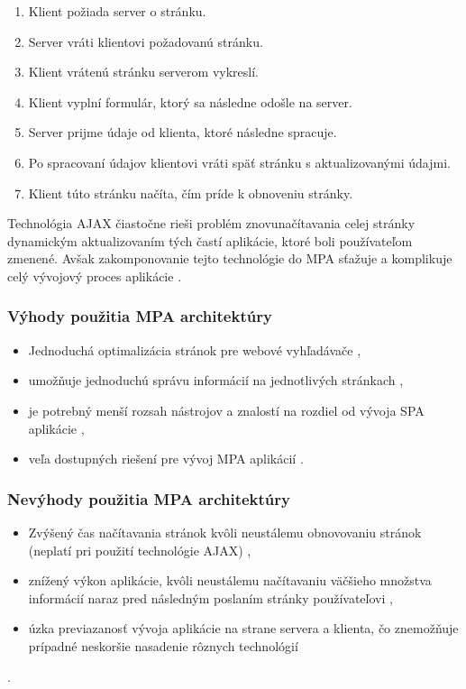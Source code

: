 \begin{enumerate}
	\item Klient požiada server o stránku.
	\item Server vráti klientovi požadovanú stránku.
	\item Klient vrátenú stránku serverom vykreslí.
	\item Klient vyplní formulár, ktorý sa následne odošle na server.
	\item Server prijme údaje od klienta, ktoré následne spracuje.
	\item Po spracovaní údajov klientovi vráti späť stránku s aktualizovanými údajmi.
	\item Klient túto stránku načíta, čím príde k obnoveniu stránky.
\end{enumerate}

Technológia AJAX čiastočne rieši problém znovunačítavania celej stránky dynamickým aktualizovaním tých častí aplikácie, ktoré boli používateľom zmenené. Avšak zakomponovanie tejto technológie do MPA sťažuje a komplikuje celý vývojový proces aplikácie \cite{mpa-architektura}.

\subsubsection*{Výhody použitia MPA architektúry}

\begin{itemize}
	\item Jednoduchá optimalizácia stránok pre webové vyhľadávače \cite{spa-vs-mpa-1},
	\item umožňuje jednoduchú správu informácií na jednotlivých stránkach \cite{spa-vs-mpa-3},
	\item je potrebný menší rozsah nástrojov a znalostí na rozdiel od vývoja SPA aplikácie \cite{spa-vs-mpa-2},
	\item veľa dostupných riešení pre vývoj MPA aplikácií \cite{spa-vs-mpa-2}.
\end{itemize}


\subsubsection*{Nevýhody použitia MPA architektúry}

\begin{itemize}
	\item Zvýšený čas načítavania stránok kvôli neustálemu obnovovaniu stránok (neplatí pri použití technológie AJAX) \cite{spa-vs-mpa-1},
	\item znížený výkon aplikácie, kvôli neustálemu načítavaniu väčšieho množstva informácií naraz pred následným poslaním stránky používateľovi \cite{spa-vs-mpa-1},
	\item úzka previazanosť vývoja aplikácie na strane servera a klienta, čo znemožňuje prípadné neskoršie nasadenie rôznych technológií \cite{spa-vs-mpa-2}
\end{itemize}.


